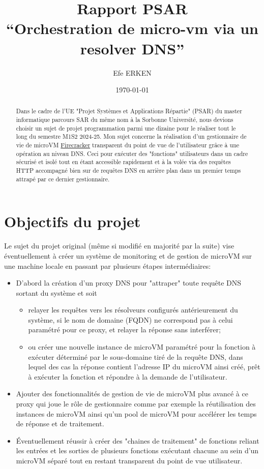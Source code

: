 \documentclass[12pt]{article}
\author{Efe ERKEN}
\date{\today}
\title{Rapport PSAR  \\ ``Orchestration de micro-vm via un resolver DNS''}
\begin{document}
\maketitle

\begin{abstract}
	Dans le cadre de l'UE "Projet Systèmes et Applications Répartie" (PSAR) du master informatique parcours SAR du même nom à la Sorbonne Université, nous devions choisir un sujet de projet programmation parmi une dizaine pour le réaliser tout le long du semestre M1S2 2024-25. Mon sujet concerne la réalisation d'un gestionnaire de vie de microVM \href{https://firecracker-microvm.github.io/}{Firecracker} transparent du point de vue de l'utilisateur grâce à une opération au niveau DNS. Ceci pour exécuter des "fonctions" utilisateurs dans un cadre sécurisé et isolé tout en étant accessible rapidement et à la volée via des requêtes HTTP accompagné bien sur de requêtes DNS en arrière plan dans un premier temps attrapé par ce dernier gestionnaire.
\end{abstract}

\section{Objectifs du projet}
Le sujet du projet original (même si modifié en majorité par la suite) vise éventuellement à créer un système de monitoring et de gestion de microVM sur une machine locale en passant par plusieurs étapes intermédiaires:

\begin{itemize}
	\item D'abord la création d'un proxy DNS pour "attraper" toute requête DNS sortant du système et soit
		\begin{itemize}
			\item relayer les requêtes vers les résolveurs configurés antérieurement du système, si le nom de domaine (FQDN) ne correspond pas à celui paramétré pour ce proxy, et relayer la réponse sans interférer;
			\item ou créer une nouvelle instance de microVM paramétré pour la fonction à exécuter déterminé par le sous-domaine tiré de la requête DNS, dans lequel des cas la réponse contient l'adresse IP du microVM ainsi créé, prêt à exécuter la fonction et répondre à la demande de l'utilisateur.
		\end{itemize}
	\item Ajouter des fonctionnalités de gestion de vie de microVM plus avancé à ce proxy qui joue le rôle de gestionnaire comme par exemple la réutilisation des instances de microVM ainsi qu'un pool de microVM pour accélérer les temps de réponse et de traitement.
	\item Éventuellement réussir à créer des "chaines de traitement" de fonctions reliant les entrées et les sorties de plusieurs fonctions exécutant chacune au sein d'un microVM séparé tout en restant transparent du point de vue utilisateur.
\end{itemize}
\end{document}
